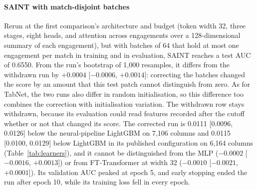 \paragraph{SAINT with match-disjoint batches}
Rerun at the first comparison's architecture and budget (token width 32, three stages, eight heads, and
attention across engagements over a 128-dimensional summary of each engagement), but with batches of 64
that hold at most one engagement per match in training and in evaluation, SAINT reaches a test AUC of
0.6550. From the run's bootstrap of 1,000 resamples, it differs from the withdrawn run by $+0.0004$
[$-0.0006$, $+0.0014$]: correcting the batches changed the score by an amount that this test patch cannot
distinguish from zero. As for TabNet, the two runs also differ in random initialisation, so this difference
too combines the correction with initialisation variation. The withdrawn row stays withdrawn, because its
evaluation could read features recorded after the cutoff whether or not that changed its score. The
corrected run is 0.0111 [0.0096, 0.0126] below the neural-pipeline LightGBM on 7,106 columns and 0.0115
[0.0100, 0.0129] below LightGBM in its published configuration on 6,164 columns (Table~\ref{tab:learners}),
and it cannot be distinguished from the MLP ($-0.0002$ [$-0.0016$, $+0.0013$]) or from FT-Transformer at
width 32 ($-0.0010$ [$-0.0021$, $+0.0001$]).
Its validation AUC peaked at epoch 5, and early stopping ended the run after epoch 10, while its training
loss fell in every epoch.

